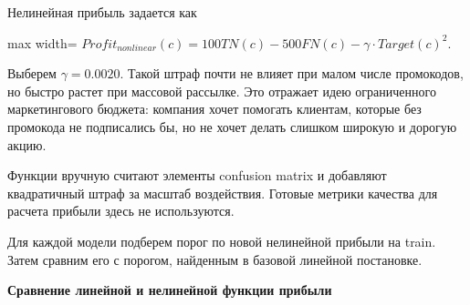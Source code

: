 \documentclass[11pt]{article}
\begin{document}
Нелинейная прибыль задается как

\begin{center}
\begin{adjustbox}{max width=\linewidth}
\(\displaystyle Profit_{nonlinear}(c) = 100TN(c) - 500FN(c) - \gamma \cdot Target(c)^2.\)
\end{adjustbox}
\end{center}

Выберем \(\gamma = 0.0020\). Такой штраф почти не влияет при малом числе
промокодов, но быстро растет при массовой рассылке. Это отражает идею
ограниченного маркетингового бюджета: компания хочет помогать клиентам,
которые без промокода не подписались бы, но не хочет делать слишком
широкую и дорогую акцию.

    Функции вручную считают элементы confusion matrix и добавляют
квадратичный штраф за масштаб воздействия. Готовые метрики качества для
расчета прибыли здесь не используются.

    Для каждой модели подберем порог по новой нелинейной прибыли на train.
Затем сравним его с порогом, найденным в базовой линейной постановке.

    \textbf{Сравнение линейной и нелинейной функции прибыли}
\end{document}

